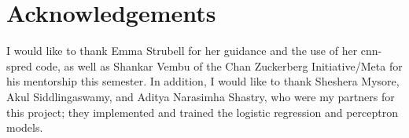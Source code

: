\documentclass{acm_proc_article-sp}
\begin{document}
\section{Acknowledgements}
I would like to thank Emma Strubell for her guidance and the use of her cnn-spred code, as well as Shankar Vembu of the Chan Zuckerberg Initiative/Meta for his mentorship this semester. In addition, I would like to thank Sheshera Mysore, Akul Siddlingaswamy, and Aditya Narasimha Shastry, who were my partners for this project; they implemented and trained the logistic regression and perceptron models.




\end{document}
